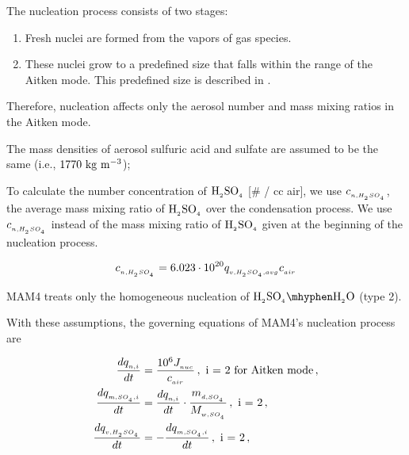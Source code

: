 \begin{assume}
  The nucleation process consists of two stages:
  \begin{enumerate}
    \item Fresh nuclei are formed from the vapors of gas species.
    \item These nuclei grow to a predefined size that falls within the range
      of the Aitken mode. This predefined size is described in
      .
  \end{enumerate}
  Therefore, nucleation affects only the aerosol number and mass mixing ratios
  in the Aitken mode.
\end{assume}

\begin{assume}
  The mass densities of aerosol sulfuric acid and sulfate are assumed to be the
  same (i.e., $\rm 1770~kg~m^{-3}$);
\end{assume}

\begin{assume}
  To calculate the number concentration of $\rm H_{_2}SO_{_4}$ [\# / cc air], we use
  $c_{_{n,H_{_2}SO_{_4}}}$, the average mass mixing ratio of $\rm H_{_2}SO_{_4}$ over the
  condensation process. We use $c_{_{n, H_{_2}SO_{_4}}}$ instead of the mass mixing
  ratio of $\rm H_{_2}SO_{_4}$ given at the beginning of the nucleation process.

  $$c_{_{n,H_{_2}SO_{_4}}} = 6.023 \cdot 10^{20} q_{_{v,H_{_2}SO_{_4},avg}} c_{_{air}}$$

\end{assume}


\begin{assume}
  MAM4 treats only the homogeneous nucleation of $\rsag \mhyphen \rwater$
  (type 2).
\end{assume}

With these assumptions, the governing equations of MAM4's nucleation process
are

\begin{align}
  \frac{dq\dsub{n,i}}{dt} &= \frac{10^6 J\dsub{nuc}}{c\dsub{air}} \,, \text{ i = 2 for Aitken mode} \,, \labeleq{nuc:jnuc} \\
  \frac{d\amass{\asf}}{dt} &= \frac{dq\dsub{n,i}}{dt} \cdot \frac{m\dsub{d,\asf}}{\mw{\asf}} \,, \text{ i = 2} \,, \labeleq{nuc:amass} \\
  \frac{d\vmass{\sag}}{dt} &= -\frac{d\amass{\asf}}{dt} \,, \text{ i = 2} \,, \labeleq{nuc:vmass}
\end{align}

